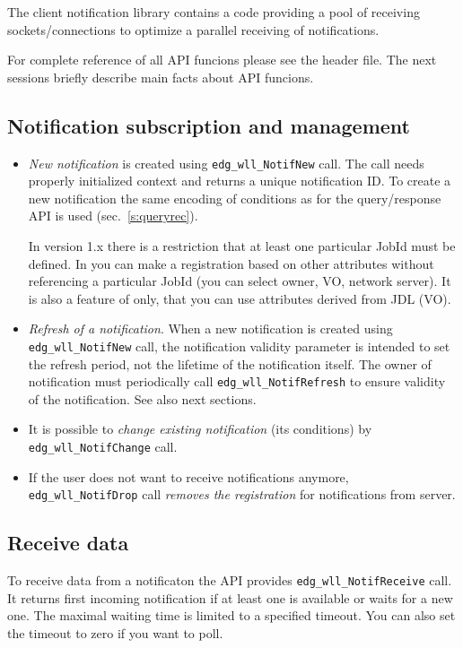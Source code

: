 The client notification library contains a code providing a pool of
receiving sockets/connections to optimize a parallel receiving of
notifications.

For complete reference of all API funcions please see the header
file. The next sessions briefly describe main facts about API
funcions.

\subsection{Notification subscription and management}
\begin{itemize}
 \item \emph{New notification} is created using
  \verb'edg_wll_NotifNew' call. The call needs properly initialized
  context and returns a unique notification ID. To create a new
  notification the same encoding of conditions as for the \LB
  query/response API is used (sec.~\ref{s:queryrec}). 

  In version 1.x there is a restriction that at least one particular
  JobId must be defined. In  you can make a registration based
  on other attributes without referencing a particular JobId (you can
  select owner, VO, network server).  It is also a feature of 
  only, that you can use attributes derived from JDL (VO).

 \item \emph {Refresh of a notification}. When a new notification is
  created using \verb'edg_wll_NotifNew' call, the notification
  validity parameter is intended to set the refresh period, not the
  lifetime of the notification itself. The owner of notification must
  periodically call \verb'edg_wll_NotifRefresh' to ensure validity of
  the notification. See also next sections.

 \item It is possible to \emph{change existing notification} (its conditions) by
  \verb'edg_wll_NotifChange' call.

 \item If the user does not want to receive notifications anymore,
  \verb'edg_wll_NotifDrop' call \emph{removes the registration} for
  notifications from \LB server.
\end{itemize}

\subsection{Receive data}
To receive data from a notificaton the API provides
\verb'edg_wll_NotifReceive' call. It returns first incoming
notification if at least one is available or waits for a new one. The
maximal waiting time is limited to a specified timeout. You can also set the
timeout to zero if you want to poll.

